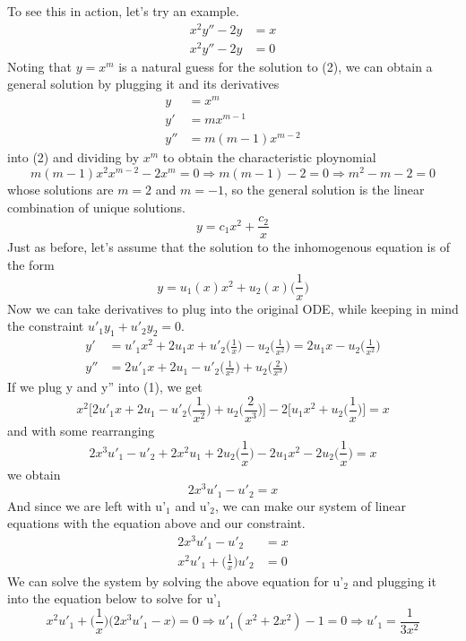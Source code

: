 \documentclass{article}
\newcommand{\be}{\begin{equation}}
\newcommand{\ee}{\end{equation}}
\begin{document}
To see this in action, let's try an example.
\be
\begin{split}
  x^2 y'' - 2y &= x \\
  x^2 y'' - 2y &= 0
\end{split}
\ee
Noting that $y = x^m$ is a natural guess for the solution to (2), we can obtain a general solution by plugging it and its derivatives
\be
\begin{split}
  y &= x^m \\
  y' &= m x^{m-1} \\
  y'' &= m(m-1)x^{m-2}
\end{split}
\ee
into (2) and dividing by $x^m$ to obtain the characteristic ploynomial
\be
m(m-1) x^2 x^{m-2} - 2 x^m = 0 \Rightarrow m(m-1) - 2 = 0 \Rightarrow m^2 - m - 2 = 0
\ee
whose solutions are $m = 2$ and $m = -1$, so the general solution is the linear combination of unique solutions.
\be
y = c_1 x^2 + \frac{c_2}{x}
\ee
Just as before, let's assume that the solution to the inhomogenous equation is of the form
\be
y = u_1(x) x^2 + u_2(x) \Big( \frac{1}{x} \Big)
\ee
Now we can take derivatives to plug into the original ODE, while keeping in mind the constraint $u'_1 y_1 + u'_2 y_2 = 0$.
\be
\begin{split}
  y' &= u'_1 x^2 + 2 u_1 x  + u'_2 \Big( \frac{1}{x} \Big) - u_2 \Big( \frac{1}{x^2} \Big) = 2u_1 x - u_2 \Big( \frac{1}{x^2} \Big) \\
  y'' &= 2 u'_1 x + 2u_1 - u'_2 \Big( \frac{1}{x^2} \Big) + u_2 \Big( \frac{2}{x^3} \Big)
\end{split}
\ee
If we plug y and y'' into (1), we get
\be
  x^2 \Big[ 2 u'_1 x + 2u_1 - u'_2 \Big( \frac{1}{x^2} \Big) + u_2 \Big( \frac{2}{x^3} \Big) \Big] - 2 \Big[ u_1 x^2 + u_2 \Big( \frac{1}{x} \Big) \Big] = x
\ee
and with some rearranging
\be
2x^3 u'_1 - u'_2 + 2x^2 u_1 + 2u_2 \Big( \frac{1}{x} \Big) - 2u_1 x^2 - 2u_2 \Big(\frac{1}{x} \Big) = x
\ee
we obtain
\be
2x^3 u'_1 - u'_2 = x
\ee
And since we are left with u'$_1$ and u'$_2$, we can make our system of linear equations with the equation above and our constraint.
\be
\begin{split}
  2x^3 u'_1 - u'_2 &= x \\
  x^2 u'_1 + \Big( \frac{1}{x} \Big) u'_2 &= 0
\end{split}
\ee
We can solve the system by solving the above equation for u'$_2$ and plugging it into the equation below to solve for u'$_1$
\be
x^2u'_1 + \Big( \frac{1}{x} \Big) \Big( 2x^3 u'_1 - x \Big) = 0 \Rightarrow u'_1( x^2 + 2x^2) - 1 = 0 \Rightarrow u'_1 = \frac{1}{3x^2}
\ee
\end{document}
